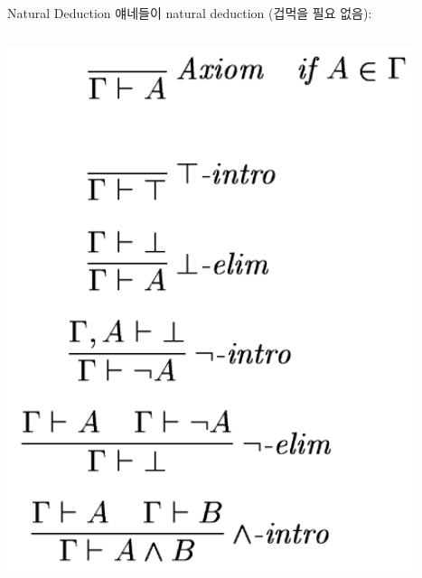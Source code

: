 \documentclass[../231120_msquare_computational-logic.tex]{subfiles}
\begin{document}
\begin{frame}{Natural Deduction}
    얘네들이 natural deduction (겁먹을 필요 없음): \vspace*{-1.7em}
    \begin{columns}
    \begin{column}{0.27\textwidth}
        \begin{center}
        \includegraphics[width=1.2\textwidth]{./natural_deduction_1.png}
        \end{center}
    \end{column}
    \begin{column}{0.3\textwidth}
        \begin{center}

\end{center}
\end{column}
\end{columns}
\end{frame}
\end{document}
